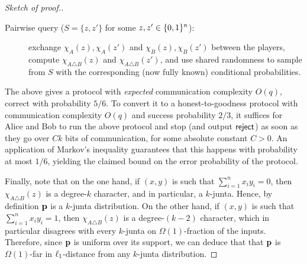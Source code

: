 \begin{proof}[Sketch of proof.]
\begin{description}
\item[Pairwise query ($S=\{z,z'\}$ for some $z,z'\in\bitset^n$):] exchange $\chi_A(z),\chi_A(z')$ and $\chi_B(z),\chi_B(z')$ between the players, compute $\chi_{A \triangle B}(z)$ and $\chi_{A \triangle B}(z')$, and use shared randomness to sample from $S$ with the corresponding (now fully known) conditional probabilities. 
\end{description}
The above gives a protocol with \emph{expected} communication complexity $O(q)$, correct with probability $5/6$. To convert it to a honest-to-goodness protocol with communication complexity $O(q)$ and success probability $2/3$, it suffices for Alice and Bob to run the above protocol and stop (and output $\reject$) as soon as they go over $Ck$ bits of communication, for some absolute constant $C>0$. An application of Markov's inequality guarantees that this happens with probability at most $1/6$, yielding the claimed bound on the error probability of the protocol.

Finally, note that on the one hand, if $(x,y)$ is such that $\sum_{i =1}^n x_i y_i = 0$, then $\chi_{A \triangle B}(z)$ is a degree-$k$ character, and in particular, a $k$-junta. Hence, by definition $\p$ is a $k$-junta distribution. On the other hand, if $(x,y)$ is such that $\sum_{i =1}^n x_i y_i = 1$, then $\chi_{A \triangle B}(z)$ is a degree-$(k-2)$ character, which in particular disagrees with every $k$-junta on $\Omega(1)$-fraction of the inputs. Therefore, since $\p$ is uniform over its support, we can deduce that that $\p$ is $\Omega(1)$-far in $\lp[1]$-distance from any $k$-junta distribution.
\end{proof}
